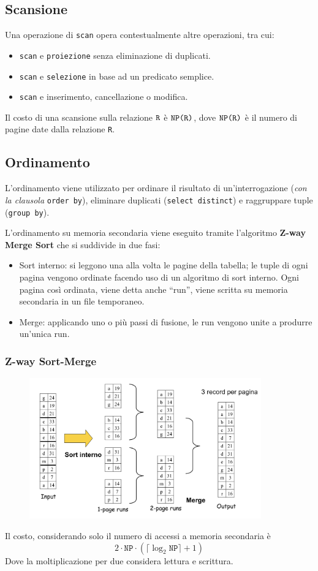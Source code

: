 \documentclass[oneside,a4paper,11pt]{book}
\theoremstyle{italicstyle}
\theoremstyle{normStyle}
\begin{document}
\subsection{Scansione}
Una operazione di \verb|scan| opera contestualmente altre operazioni, tra cui:
\begin{itemize}
  \item \verb|scan| e \verb|proiezione| senza eliminazione di duplicati.
  \item \verb|scan| e \verb|selezione| in base ad un predicato semplice.
  \item \verb|scan| e inserimento, cancellazione o modifica.
\end{itemize}
Il costo di una scansione sulla relazione $\verb|R|$ è $\verb|NP(R)|$, dove $\verb|NP(R)|$
è il numero di pagine date dalla relazione \verb|R|.
\subsection{Ordinamento}
L'ordinamento viene utilizzato per ordinare il risultato di un'interrogazione (\textit{con la clausola} \verb|order by|),
eliminare duplicati (\verb|select distinct|) e raggruppare tuple (\verb|group by|).

L'ordinamento su memoria secondaria viene eseguito tramite l'algoritmo \textbf{Z-way Merge Sort} che si suddivide 
in due fasi:
\begin{itemize}
  \item Sort interno: si leggono una alla volta le pagine della tabella; le tuple 
  di ogni pagina vengono ordinate facendo uso di un algoritmo di sort interno. 
  Ogni pagina così ordinata, viene detta anche  ``run'', viene scritta su memoria secondaria in un file temporaneo.
  \item Merge: applicando uno o più passi di fusione, le run vengono unite a produrre un'unica run.
\end{itemize}
\subsubsection{Z-way Sort-Merge}
\begin{figure}[H]
  \centering
  \includegraphics[width=10cm]{img/z-way-merge-sort.png}
\end{figure}
Il costo, considerando solo il numero di accessi a memoria secondaria è 
\[
  2 \cdot \texttt{NP} \cdot \left( \lceil \log_2 \texttt{NP}\rceil + 1\right)
\]
Dove la moltiplicazione per due considera lettura e scrittura.
\end{document}
